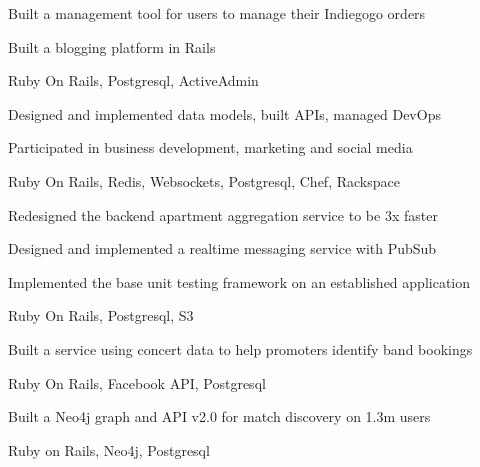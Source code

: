 \documentclass[]{modern}
\begin{document}
\begin{minipage}[t]{0.66\textwidth}

\begin{tightemize}
\item Built a management tool for users to manage their Indiegogo orders
\item Built a blogging platform in Rails
\item Ruby On Rails, Postgresql, ActiveAdmin
\end{tightemize}
\sectionsep


\begin{tightemize}
\item Designed and implemented data models, built APIs, managed DevOps
\item Participated in business development, marketing and social media
\item Ruby On Rails, Redis, Websockets, Postgresql, Chef, Rackspace
\end{tightemize}
\sectionsep


\begin{tightemize}
\item Redesigned the backend apartment aggregation service to be 3x faster
\item Designed and implemented a realtime messaging service with PubSub
\item Implemented the base unit testing framework on an established application
\item Ruby On Rails, Postgresql, S3
\end{tightemize}
\sectionsep


\begin{tightemize}
\item Built a service using concert data to help promoters identify band bookings
\item Ruby On Rails, Facebook API, Postgresql
\end{tightemize}
\sectionsep


\begin{tightemize}
\item Built a Neo4j graph and API v2.0 for match discovery on 1.3m users
\item Ruby on Rails, Neo4j, Postgresql
\end{tightemize}
\sectionsep


\end{minipage}
\end{document}
